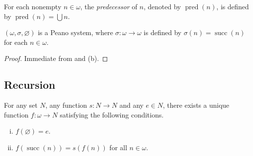 \documentclass[11pt]{article}
\DeclareMathOperator{\suc}{succ}
\DeclareMathOperator{\prd}{pred}
\begin{document}
\begin{definition}
  For each nonempty $n \in \omega$, the \emph{predecessor} of $n$, denoted by $\prd(n)$, is defined by $\prd(n) = \bigcup n$.
\end{definition}

\begin{theorem}
  $(\omega, \sigma, \varnothing)$ is a Peano system, where $\sigma: \omega \to \omega$ is defined by $\sigma(n) = \suc(n)$ for each $n \in \omega$.
\end{theorem}
\begin{proof}
  Immediate from  and  (b).
\end{proof}

\subsection{Recursion}
\begin{theorem}
  \label{thm:recursion}
  For any set $N$, any function $s: N \to N$ and any $e \in N$, there exists a unique function $f: \omega \to N$ satisfying the following conditions.
  \begin{enumerate}[(i)]
    \item $f(\varnothing) = e$.
    \item $f(\suc(n)) = s(f(n))$ for all $n \in \omega$.
  \end{enumerate}
\end{theorem}
\end{document}

